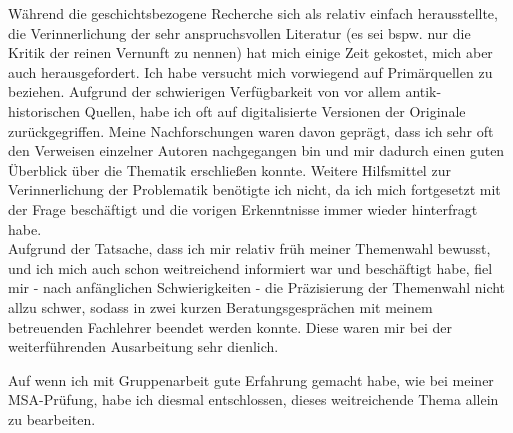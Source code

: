 \documentclass[11pt,a4paper,final]{article}
\begin{document}
Während die geschichtsbezogene Recherche sich als relativ einfach herausstellte, die Verinnerlichung der sehr anspruchsvollen Literatur (es sei bspw. nur die Kritik der reinen Vernunft %
 zu nennen) hat mich einige Zeit gekostet, mich aber auch herausgefordert. Ich habe versucht mich vorwiegend auf Primärquellen zu beziehen. Aufgrund der schwierigen Verfügbarkeit von vor allem antik-historischen Quellen, habe ich oft auf digitalisierte Versionen der Originale zurückgegriffen.
Meine Nachforschungen waren davon geprägt, dass ich sehr oft den Verweisen einzelner Autoren nachgegangen bin und mir dadurch einen guten Überblick über die Thematik erschließen konnte. Weitere Hilfsmittel zur Verinnerlichung der Problematik benötigte ich nicht, da ich mich fortgesetzt mit der Frage beschäftigt und die vorigen Erkenntnisse immer wieder hinterfragt habe.\\

Aufgrund der Tatsache, dass ich mir relativ früh meiner Themenwahl bewusst, und ich mich auch schon weitreichend informiert war und beschäftigt habe, fiel mir - nach anfänglichen Schwierigkeiten - die Präzisierung der Themenwahl nicht allzu schwer, sodass in zwei kurzen Beratungsgesprächen mit meinem betreuenden Fachlehrer beendet werden konnte. Diese waren mir bei der weiterführenden Ausarbeitung sehr dienlich.

Auf wenn ich mit Gruppenarbeit gute Erfahrung gemacht habe, wie bei meiner MSA-Prüfung, habe ich diesmal entschlossen, dieses weitreichende Thema allein zu bearbeiten.
\end{document}
